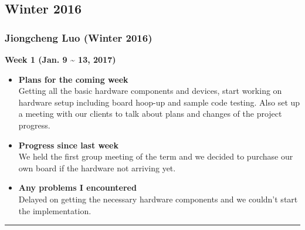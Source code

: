 \newpage
	\subsection{Winter 2016}

	\subsubsection{Jiongcheng Luo (Winter 2016)}
	\vspace{0.5cm}

	\begin{center}
		\textbf{Week 1 (Jan. 9 {\textasciitilde{}} 13, 2017)}
	\end{center}
	\begin{itemize}
		\item \textbf{Plans for the coming week}
		\\Getting all the basic hardware components and devices, start working on hardware setup including board hoop-up and sample code testing. Also set up a meeting with our clients to talk about plans and changes of the project progress.\\

		\item \textbf{Progress since last week}
		\\We held the first group meeting of the term and we decided to purchase our own board if the hardware not arriving yet.\\

		\item \textbf{Any problems I encountered}
		\\Delayed on getting the necessary hardware components and we couldn't start the implementation.\\
	\end{itemize}

	\rule{\textwidth}{0.5pt}

